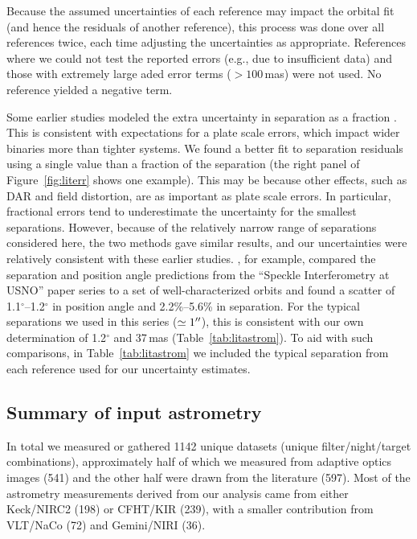 \documentclass[twocolumn]{aastex62}
\begin{document}
Because the assumed uncertainties of each reference may impact the orbital fit (and hence the residuals of another reference), this process was done over all references twice, each time adjusting the uncertainties as appropriate. References where we could not test the reported errors (e.g., due to insufficient data) and those with extremely large aded error terms ($>100$\,mas) were not used. No reference yielded a negative term. 

Some earlier studies modeled the extra uncertainty in separation as a fraction \citep[e.g.,][]{Hrt2008,Hor2011,Tok2012d}. This is consistent with expectations for a plate scale errors, which impact wider binaries more than tighter systems. We found a better fit to separation residuals using a single value than a fraction of the separation (the right panel of Figure~\ref{fig:literr} shows one example). This may be because other effects, such as DAR and field distortion, are as important as plate scale errors. In particular, fractional errors tend to underestimate the uncertainty for the smallest separations. However, because of the relatively narrow range of separations considered here, the two methods gave similar results, and our uncertainties were relatively consistent with these earlier studies. \citet{2007AJ....134.1671M}, for example, compared the separation and position angle predictions from the ``Speckle Interferometry at USNO'' paper series to a set of well-characterized orbits and found a scatter of 1.1$^{\circ}$--1.2$^{\circ}$ in position angle and 2.2\%--5.6\% in separation. For the typical separations we used in this series ($\simeq1\mbox{$^{\prime\prime}$}$), this is consistent with our own determination of 1.2$^{\circ}$ and 37\,mas (Table~\ref{tab:litastrom}). To aid with such comparisons, in Table~\ref{tab:litastrom} we included the typical separation from each reference used for our uncertainty estimates.


\subsection{Summary of input astrometry}

In total we measured or gathered 1142 unique datasets (unique filter/night/target combinations), approximately half of which we measured from adaptive optics images (541) and the other half were drawn from the literature (597). Most of the astrometry measurements derived from our analysis came from either Keck/NIRC2 (198) or CFHT/KIR (239), with a smaller contribution from VLT/NaCo (72) and Gemini/NIRI (36). 
\end{document}
